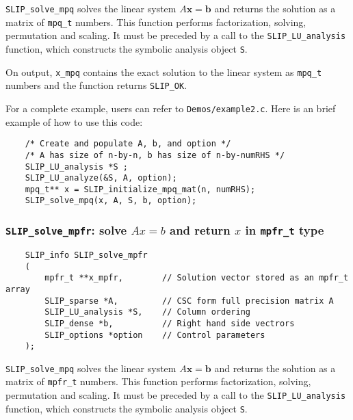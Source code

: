 \documentclass[12pt]{article}
\theoremstyle{definition}
\begin{document}
\verb|SLIP_solve_mpq| solves the linear system $A\mathbf{x}=\mathbf{b}$ and
returns the solution as a matrix of \verb|mpq_t| numbers. This function
performs factorization, solving, permutation and scaling.  It must be preceded
by a call to the \verb|SLIP_LU_analysis| function, which constructs the
symbolic analysis object \verb|S|.

On output, \verb|x_mpq| contains the exact solution to the linear system
as \verb|mpq_t| numbers and the function returns \verb|SLIP_OK|.

For a complete example, users can refer to \verb|Demos/example2.c|. Here is an
brief example of how to use this code:

{\small
\begin{verbatim}
    /* Create and populate A, b, and option */
    /* A has size of n-by-n, b has size of n-by-numRHS */
    SLIP_LU_analysis *S ;
    SLIP_LU_analyze(&S, A, option);
    mpq_t** x = SLIP_initialize_mpq_mat(n, numRHS);
    SLIP_solve_mpq(x, A, S, b, option);
\end{verbatim}
}

\cprotect\subsubsection{\verb|SLIP_solve_mpfr|: solve $Ax=b$ and return $x$ in \verb|mpfr_t| type}
\label{ss:SLIP_solve_mpfr}

\begin{mdframed}[userdefinedwidth=6in]
{\footnotesize
\begin{verbatim}
    SLIP_info SLIP_solve_mpfr
    (
        mpfr_t **x_mpfr,        // Solution vector stored as an mpfr_t array
        SLIP_sparse *A,         // CSC form full precision matrix A
        SLIP_LU_analysis *S,    // Column ordering
        SLIP_dense *b,          // Right hand side vectrors
        SLIP_options *option    // Control parameters
    );
\end{verbatim}
} \end{mdframed}


\verb|SLIP_solve_mpq| solves the linear system $A\mathbf{x}=\mathbf{b}$ and
returns the solution as a matrix of \verb|mpfr_t| numbers. This function
performs factorization, solving, permutation and scaling.  It must be preceded
by a call to the \verb|SLIP_LU_analysis| function, which constructs the
symbolic analysis object \verb|S|.
\end{document}
